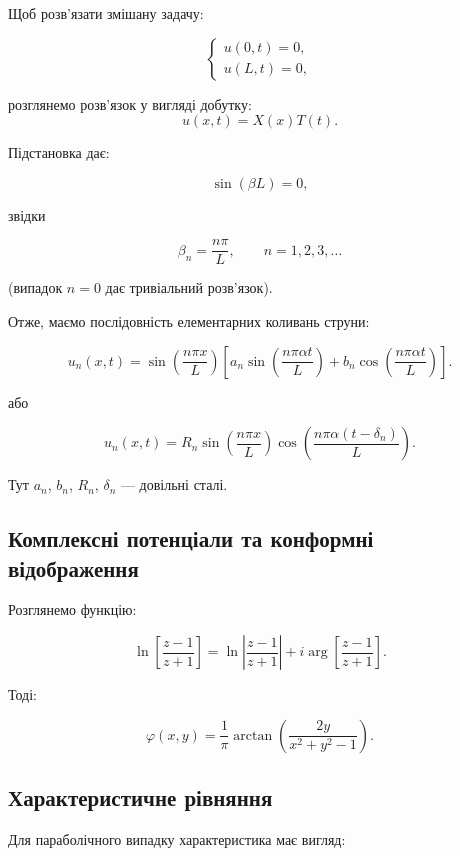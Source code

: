 \documentclass[
  ukrainian,
]{article}
\begin{document}
Щоб розв'язати змішану задачу:

\[
\begin{cases}
u(0,t)=0,\\
u(L,t)=0,
\end{cases}
\]

розглянемо розв'язок у вигляді добутку: \[
u(x,t)=X(x)T(t).
\]

Підстановка дає:

\[
\sin(\beta L)=0,
\]

звідки

\[
\beta_n = \frac{n\pi}{L}, \qquad n=1,2,3,\ldots
\]

(випадок \(n=0\) дає тривіальний розв'язок).

Отже, маємо послідовність елементарних коливань струни:

\[
u_n(x,t)=\sin\!\left(\frac{n\pi x}{L}\right)
\left[a_n \sin\!\left(\frac{n\pi \alpha t}{L}\right)
+ b_n \cos\!\left(\frac{n\pi \alpha t}{L}\right)\right].
\]

або

\[
u_n(x,t)=R_n \sin\!\left(\frac{n\pi x}{L}\right)
\cos\!\left(\frac{n\pi \alpha (t-\delta_n)}{L}\right).
\]

Тут \(a_n\), \(b_n\), \(R_n\), \(\delta_n\) --- довільні сталі.

\subsection{Комплексні потенціали та конформні
відображення}\label{ux43aux43eux43cux43fux43bux435ux43aux441ux43dux456-ux43fux43eux442ux435ux43dux446ux456ux430ux43bux438-ux442ux430-ux43aux43eux43dux444ux43eux440ux43cux43dux456-ux432ux456ux434ux43eux431ux440ux430ux436ux435ux43dux43dux44f}

Розглянемо функцію:

\[
\ln\left[\frac{z-1}{z+1}\right]
= \ln\left|\frac{z-1}{z+1}\right|
+ i \arg\left[\frac{z-1}{z+1}\right].
\]

Тоді:

\[
\varphi(x,y)=\frac{1}{\pi}\arctan\left(\frac{2y}{x^2+y^2-1}\right).
\]

\subsection{Характеристичне
рівняння}\label{ux445ux430ux440ux430ux43aux442ux435ux440ux438ux441ux442ux438ux447ux43dux435-ux440ux456ux432ux43dux44fux43dux43dux44f}

Для параболічного випадку характеристика має вигляд:
\end{document}
